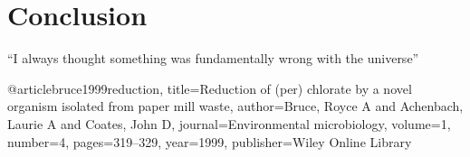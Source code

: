 \documentclass{article}
\begin{document}
\section{Conclusion}
``I always thought something was fundamentally wrong with the universe'' \citep{adams1995hitchhiker}


@article{bruce1999reduction,
  title={Reduction of (per) chlorate by a novel organism isolated from paper mill waste},
  author={Bruce, Royce A and Achenbach, Laurie A and Coates, John D},
  journal={Environmental microbiology},
  volume={1},
  number={4},
  pages={319--329},
  year={1999},
  publisher={Wiley Online Library}
}

\end{document}
